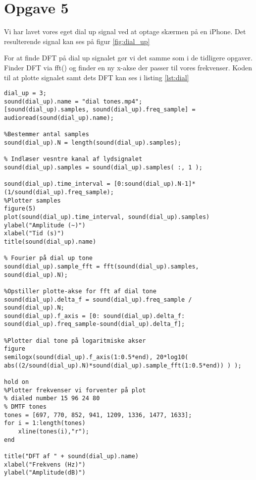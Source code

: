 \documentclass[../main.tex]{subfiles}
\begin{document}
\section{Opgave 5}

Vi har lavet vores eget dial up signal ved at optage skærmen på en iPhone. Det resulterende signal kan ses på figur \ref{fig:dial_up}


For at finde DFT på dial up signalet gør vi det samme som i de tidligere opgaver. Finder DFT via fft() og finder en ny x-akse der passer til vores frekvenser. Koden til at plotte signalet samt dets DFT kan ses i listing \ref{lst:dial}

\begin{lstlisting}[caption={Kode til at plotte dial up singal og DFT}, label=lst:dial]
%Indlæser samples og frekvens af dial tone
dial_up = 3;
sound(dial_up).name = "dial tones.mp4";
[sound(dial_up).samples, sound(dial_up).freq_sample] = audioread(sound(dial_up).name);

%Bestemmer antal samples
sound(dial_up).N = length(sound(dial_up).samples);

% Indlæser vesntre kanal af lydsignalet
sound(dial_up).samples = sound(dial_up).samples( :, 1 );

sound(dial_up).time_interval = [0:sound(dial_up).N-1]*(1/sound(dial_up).freq_sample);
%Plotter samples
figure(5)
plot(sound(dial_up).time_interval, sound(dial_up).samples)
ylabel("Amplitude (~)")
xlabel("Tid (s)")
title(sound(dial_up).name)

% Fourier på dial up tone
sound(dial_up).sample_fft = fft(sound(dial_up).samples, sound(dial_up).N);

%Opstiller plotte-akse for fft af dial tone
sound(dial_up).delta_f = sound(dial_up).freq_sample / sound(dial_up).N;
sound(dial_up).f_axis = [0: sound(dial_up).delta_f: sound(dial_up).freq_sample-sound(dial_up).delta_f];

%Plotter dial tone på logaritmiske akser
figure
semilogx(sound(dial_up).f_axis(1:0.5*end), 20*log10( abs((2/sound(dial_up).N)*sound(dial_up).sample_fft(1:0.5*end)) ) );

hold on
%Plotter frekvenser vi forventer på plot
% dialed number 15 96 24 80
% DMTF tones
tones = [697, 770, 852, 941, 1209, 1336, 1477, 1633];
for i = 1:length(tones)
    xline(tones(i),"r");
end

title("DFT af " + sound(dial_up).name)
xlabel("Frekvens (Hz)")
ylabel("Amplitude(dB)")
\end{lstlisting}
\end{document}
